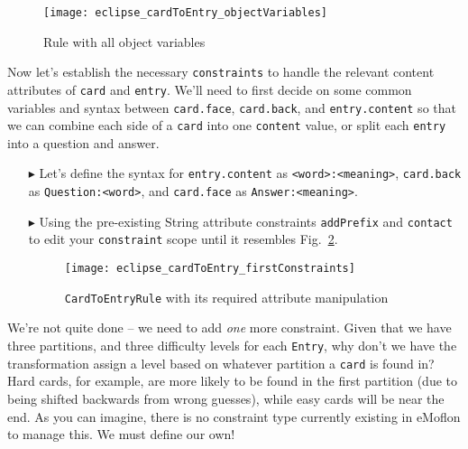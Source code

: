 \begin{itemize}
\newpage

\begin{figure}[htb]
\begin{center}
  \texttt{[image: eclipse\_cardToEntry\_objectVariables]}
  \caption{Rule with all object variables}
  \label{eclipse:c2eAllReferences}
\end{center}
\end{figure}

\end{itemize}

Now let's establish the necessary \texttt{constraints} to handle the relevant content attributes of \texttt{card} and \texttt{entry}. We'll need to
first decide on some common variables and syntax between \texttt{card.face}, \texttt{card.back}, and \texttt{entry.content} so that we can combine each side of
a \texttt{card} into one \texttt{content} value, or split each \texttt{entry} into a question and answer. 

\begin{itemize}

\item[$\blacktriangleright$] Let's define the syntax for \texttt{entry.content} as \texttt{<word>:<mean\-ing>}, \texttt{card\-.back} as
\texttt{Quest\-ion:<word>}, and \texttt{card.face} as \texttt{Answer:<mean\-ing>}. 

\vspace{0.5cm}

\item[$\blacktriangleright$] Using the pre-existing String attribute constraints \texttt{addPrefix} and \texttt{contact} to edit your
\texttt{constraint} scope until it resembles Fig.~\ref{eclipse:contentConstraints}.

\begin{figure}[htbp]
\begin{center}
  \texttt{[image: eclipse\_cardToEntry\_firstConstraints]}
  \caption{\texttt{CardToEntryRule} with its required attribute manipulation}
  \label{eclipse:contentConstraints}
\end{center}
\end{figure}

\end{itemize}

\newpage

We're not quite done -- we need to add \emph{one} more constraint. Given that we have three partitions, and three difficulty levels for each \texttt{Entry}, why
don't we have the transformation assign a level based on whatever partition a \texttt{card} is found in? Hard cards, for example, are more likely to be found in the first
partition (due to being shifted backwards from wrong guesses), while easy cards will be near the end.  As you can imagine, there is no constraint type currently
existing in eMoflon to manage this. We must define our own!

